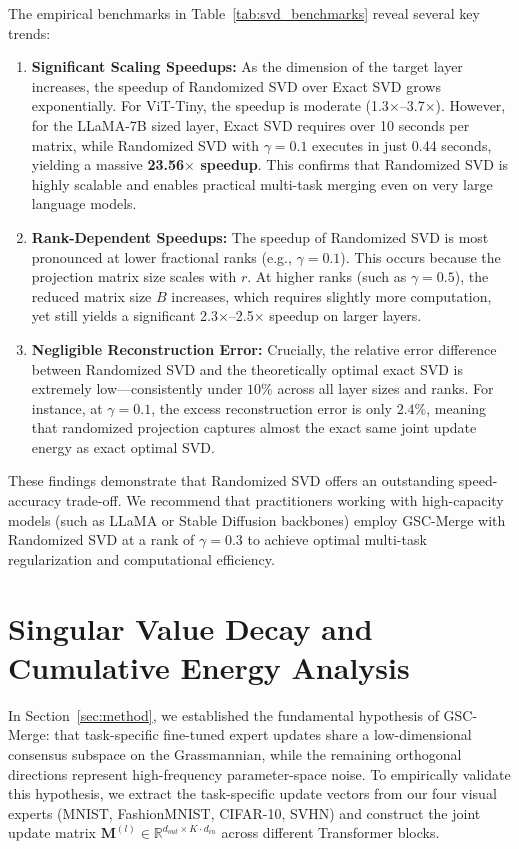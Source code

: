 \documentclass{article}
\theoremstyle{plain}
\theoremstyle{definition}
\theoremstyle{remark}
\begin{document}
The empirical benchmarks in Table~\ref{tab:svd_benchmarks} reveal several key trends:
\begin{enumerate}
    \item \textbf{Significant Scaling Speedups:} As the dimension of the target layer increases, the speedup of Randomized SVD over Exact SVD grows exponentially. For ViT-Tiny, the speedup is moderate (1.3$\times$--3.7$\times$). However, for the LLaMA-7B sized layer, Exact SVD requires over 10 seconds per matrix, while Randomized SVD with $\gamma=0.1$ executes in just 0.44 seconds, yielding a massive \textbf{23.56$\times$ speedup}. This confirms that Randomized SVD is highly scalable and enables practical multi-task merging even on very large language models.
    \item \textbf{Rank-Dependent Speedups:} The speedup of Randomized SVD is most pronounced at lower fractional ranks (e.g., $\gamma=0.1$). This occurs because the projection matrix size scales with $r$. At higher ranks (such as $\gamma=0.5$), the reduced matrix size $B$ increases, which requires slightly more computation, yet still yields a significant 2.3$\times$--2.5$\times$ speedup on larger layers.
    \item \textbf{Negligible Reconstruction Error:} Crucially, the relative error difference between Randomized SVD and the theoretically optimal exact SVD is extremely low—consistently under $10\%$ across all layer sizes and ranks. For instance, at $\gamma=0.1$, the excess reconstruction error is only $2.4\%$, meaning that randomized projection captures almost the exact same joint update energy as exact optimal SVD.
\end{enumerate}

These findings demonstrate that Randomized SVD offers an outstanding speed-accuracy trade-off. We recommend that practitioners working with high-capacity models (such as LLaMA or Stable Diffusion backbones) employ GSC-Merge with Randomized SVD at a rank of $\gamma = 0.3$ to achieve optimal multi-task regularization and computational efficiency.

\section{Singular Value Decay and Cumulative Energy Analysis}
\label{appendix:singular_decay}

In Section~\ref{sec:method}, we established the fundamental hypothesis of GSC-Merge: that task-specific fine-tuned expert updates share a low-dimensional consensus subspace on the Grassmannian, while the remaining orthogonal directions represent high-frequency parameter-space noise. To empirically validate this hypothesis, we extract the task-specific update vectors from our four visual experts (MNIST, FashionMNIST, CIFAR-10, SVHN) and construct the joint update matrix $\mathbf{M}^{(l)} \in \mathbb{R}^{d_{out} \times K \cdot d_{in}}$ across different Transformer blocks.
\end{document}
